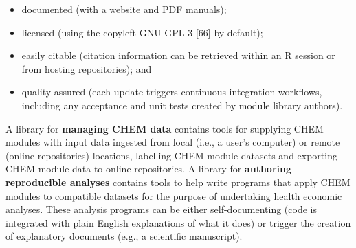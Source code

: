 \documentclass[
]{article}
\begin{document}
\begin{itemize}
\item
  documented (with a website and PDF manuals);
\item
  licensed (using the copyleft GNU GPL-3 {[}66{]} by default);
\item
  easily citable (citation information can be retrieved within an R session or from hosting repositories); and
\item
  quality assured (each update triggers continuous integration workflows, including any acceptance and unit tests created by module library authors).
\end{itemize}

A library for \textbf{managing CHEM data} contains tools for supplying CHEM modules with input data ingested from local (i.e., a user's computer) or remote (online repositories) locations, labelling CHEM module datasets and exporting CHEM module data to online repositories. A library for \textbf{authoring reproducible analyses} contains tools to help write programs that apply CHEM modules to compatible datasets for the purpose of undertaking health economic analyses. These analysis programs can be either self-documenting (code is integrated with plain English explanations of what it does) or trigger the creation of explanatory documents (e.g., a scientific manuscript).
\end{document}
